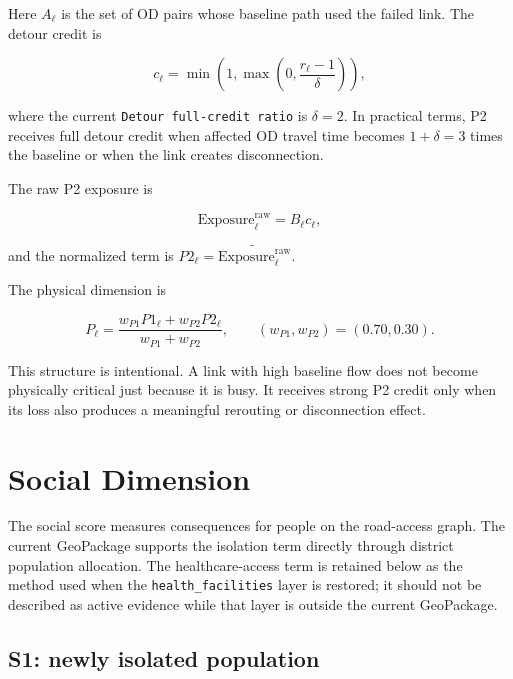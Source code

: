 \documentclass[11pt,a4paper]{article}
\begin{document}
Here $A_{\ell}$ is the set of OD pairs whose baseline path used the failed
link. The detour credit is

\begin{equation}
c_{\ell}
=\min\left(1,
\max\left(0,\frac{r_{\ell}-1}{\delta}\right)\right),
\label{eq:mlpi-detour-credit}
\end{equation}

where the current \texttt{Detour full-credit ratio} is $\delta=2$. In practical
terms, P2 receives full detour credit when affected OD travel time becomes
$1+\delta=3$ times the baseline or when the link creates disconnection.

The raw P2 exposure is

\begin{equation}
\mathrm{Exposure}^{\mathrm{raw}}_{\ell}=B_{\ell}c_{\ell},
\label{eq:mlpi-p2-raw}
\end{equation}

and the normalized term is
$P2_{\ell}=\widetilde{\mathrm{Exposure}^{\mathrm{raw}}_{\ell}}$.

The physical dimension is

\begin{equation}
P_{\ell}
=\frac{w_{P1}P1_{\ell}+w_{P2}P2_{\ell}}
        {w_{P1}+w_{P2}},
\qquad
(w_{P1},w_{P2})=(0.70,0.30).
\label{eq:mlpi-physical}
\end{equation}

This structure is intentional. A link with high baseline flow does not become
physically critical just because it is busy. It receives strong P2 credit only
when its loss also produces a meaningful rerouting or disconnection effect.

\section{Social Dimension}

The social score measures consequences for people on the road-access graph. The
current GeoPackage supports the isolation term directly through district
population allocation. The healthcare-access term is retained below as the
method used when the \texttt{health\_facilities} layer is restored; it should not
be described as active evidence while that layer is outside the current
GeoPackage.

\subsection{S1: newly isolated population}
\end{document}
